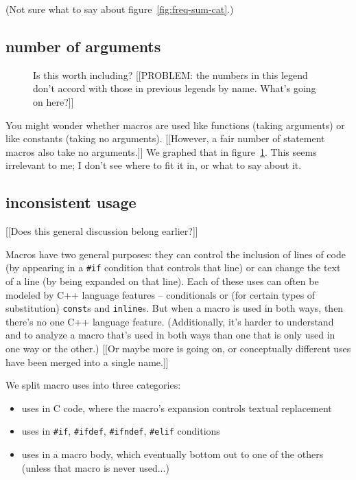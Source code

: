 \documentclass[10pt]{article}
\begin{document}
(Not sure what to say about figure~\ref{fig:freq-sum-cat}.)

\subsection{number of arguments}

\begin{figure}
\centerline{}
\caption{Is this worth including?
  [[PROBLEM:  the numbers in this legend don't accord with those in
  previous legends by name.  What's going on here?]]}
\label{fig:cat-numargs}
\end{figure}

You might wonder whether macros are used like functions (taking arguments)
or like constants (taking no arguments).  
[[However, a fair number of statement macros also take no arguments.]]
We graphed that in
figure~\ref{fig:cat-numargs}.  This seems irrelevant to me; I don't see
where to fit it in, or what to say about it.

\subsection{inconsistent usage}

[[Does this general discussion belong earlier?]]

Macros have two general purposes: they can control the inclusion of lines
of code (by appearing in a {\tt \#if} condition that controls that line) or
can change the text of a line (by being expanded on that line).  Each of
these uses can often be modeled by C++ language features -- conditionals or
(for certain types of substitution) {\tt const}s and {\tt inline}s.  But when a macro
is used in both ways, then there's no one C++ language feature.
(Additionally, it's harder to understand and to analyze a macro that's used
in both ways than one that is only used in one way or the other.)
[[Or maybe more is going on, or conceptually different uses have been
merged into a single name.]]

    We split macro uses into three categories:  
\begin{itemize}
\item
  uses in C code, where the macro's expansion controls textual
            replacement
\item
  uses in {\tt \#if}, {\tt \#ifdef}, {\tt \#ifndef}, {\tt \#elif} conditions
\item
  uses in a macro body, which eventually bottom out to one of the
            others (unless that macro is never used...)
\end{itemize}
\end{document}
